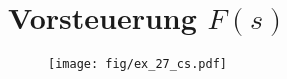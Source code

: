 \section{Vorsteuerung $F(s)$}

\begin{figure}[h!]
	\centering
	\texttt{[image: fig/ex\_27\_cs.pdf]}
\end{figure}
